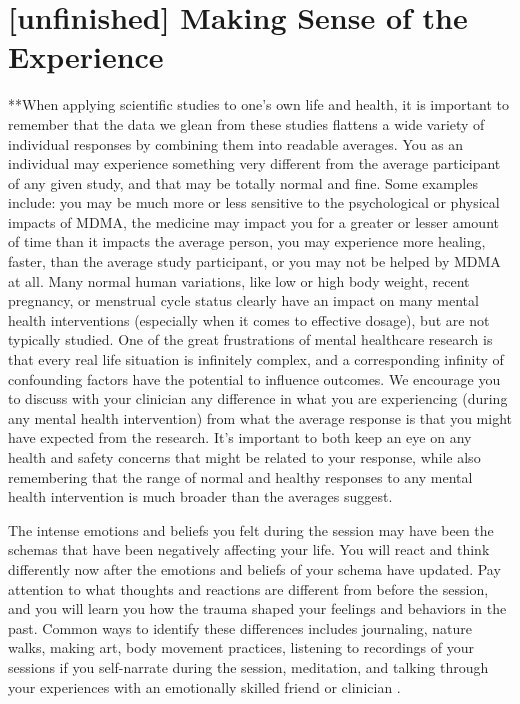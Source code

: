 \documentclass[12pt,letterpaper]{book}
\begin{document}
\section{[unfinished] Making Sense of the Experience}
\label{sectionMakingSense}
**When applying scientific studies to one's own life and health, it is important to remember that the data we glean from these studies flattens a wide variety of individual responses by combining them into readable averages. You as an individual may experience something very different from the average participant of any given study, and that may be totally normal and fine. Some examples include: you may be much more or less sensitive to the psychological or physical impacts of MDMA, the medicine may impact you for a greater or lesser amount of time than it impacts the average person, you may experience more healing, faster, than the average study participant, or you may not be helped by MDMA at all. Many normal human variations, like low or high body weight, recent pregnancy, or menstrual cycle status clearly have an impact on many mental health interventions (especially when it comes to effective dosage), but are not typically studied. One of the great frustrations of mental healthcare research is that every real life situation is infinitely complex, and a corresponding infinity of confounding factors have the potential to influence outcomes. We encourage you to discuss with your clinician any difference in what you are experiencing (during any mental health intervention) from what the average response is that you might have expected from the research. It's important to both keep an eye on any health and safety concerns that might be related to your response, while also remembering that the range of normal and healthy responses to any mental health intervention is much broader than the averages suggest.

The intense emotions and beliefs you felt during the session may have been the schemas that have been negatively affecting your life. You will react and think differently now after the emotions and beliefs of your schema have updated. Pay attention to what thoughts and reactions are different from before the session, and you will learn you how the trauma shaped your feelings and behaviors in the past. Common ways to identify these differences includes journaling, nature walks, making art, body movement practices, listening to recordings of your sessions if you self-narrate during the session, meditation, and talking through your experiences with an emotionally skilled friend or clinician \cite{mithoeferManual}.
\end{document}
